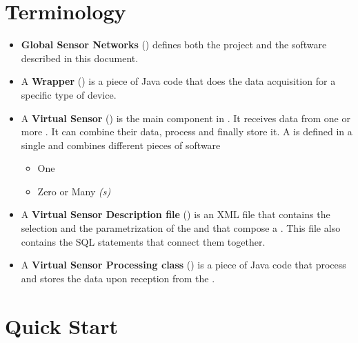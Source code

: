 \begin{comment} %
In the following we start with a detailed description of the virtual
sensor abstraction in Section~\ref{sec:virt-sens-spec}, discuss GSN's
data stream processing and time model in
Section~\ref{sec:data-stre-proc}, and present GSN's system architecture
along with a discussion of essential implementation details
in Section~\ref{sec:system-architecture}. We
evaluate the performance of GSN in Section~\ref{sec:evaluation} and
discuss related work in Section~\ref{sec:relatedwork} before
concluding.
\end{comment}
\section{Terminology}

\begin{itemize}
	\item \textbf{Global Sensor Networks} (\gsn) defines both the project and the software described in this document. \\
	\item A \textbf{Wrapper} (\wrapper) is a piece of Java code that does the data acquisition for a specific type of device. \\
	\item A \textbf{Virtual Sensor} (\vs) is the main component in \gsn. It receives data from one or more \wrapper. It can combine their data, 
		process and finally store it. A \vs is defined in a single \vsd and combines different pieces of software 
	\begin{itemize}
		\item One \vsp
		\item Zero or Many \wrapper\textit{(s)}
	\end{itemize}
	\item A \textbf{Virtual Sensor Description file} (\vsd) is an XML file that contains the selection and the parametrization of the \vsp and \wrapper that compose a \vs.
		This file also contains the SQL statements that connect them together. \\
	\item A \textbf{Virtual Sensor Processing class} (\vsp) is a piece of Java code that process and stores the data upon reception from the \wrapper. \\
\end{itemize}

\section{Quick Start}

